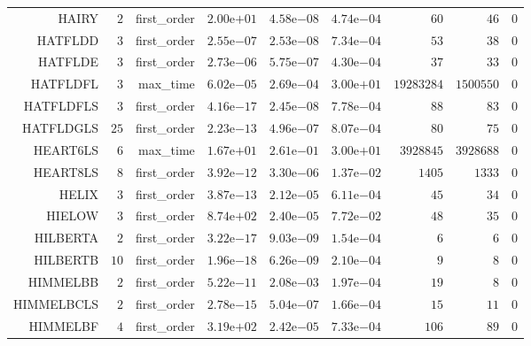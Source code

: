\begin{longtable}{rrrrrrrrr}
HAIRY & \(     2\) & first\_order & \( 2.00\)e\(+01\) & \( 4.58\)e\(-08\) & \( 4.74\)e\(-04\) & \(    60\) & \(    46\) & \(     0\) \\
HATFLDD & \(     3\) & first\_order & \( 2.55\)e\(-07\) & \( 2.53\)e\(-08\) & \( 7.34\)e\(-04\) & \(    53\) & \(    38\) & \(     0\) \\
HATFLDE & \(     3\) & first\_order & \( 2.73\)e\(-06\) & \( 5.75\)e\(-07\) & \( 4.30\)e\(-04\) & \(    37\) & \(    33\) & \(     0\) \\
HATFLDFL & \(     3\) & max\_time & \( 6.02\)e\(-05\) & \( 2.69\)e\(-04\) & \( 3.00\)e\(+01\) & \(19283284\) & \(1500550\) & \(     0\) \\
HATFLDFLS & \(     3\) & first\_order & \( 4.16\)e\(-17\) & \( 2.45\)e\(-08\) & \( 7.78\)e\(-04\) & \(    88\) & \(    83\) & \(     0\) \\
HATFLDGLS & \(    25\) & first\_order & \( 2.23\)e\(-13\) & \( 4.96\)e\(-07\) & \( 8.07\)e\(-04\) & \(    80\) & \(    75\) & \(     0\) \\
HEART6LS & \(     6\) & max\_time & \( 1.67\)e\(+01\) & \( 2.61\)e\(-01\) & \( 3.00\)e\(+01\) & \(3928845\) & \(3928688\) & \(     0\) \\
HEART8LS & \(     8\) & first\_order & \( 3.92\)e\(-12\) & \( 3.30\)e\(-06\) & \( 1.37\)e\(-02\) & \(  1405\) & \(  1333\) & \(     0\) \\
HELIX & \(     3\) & first\_order & \( 3.87\)e\(-13\) & \( 2.12\)e\(-05\) & \( 6.11\)e\(-04\) & \(    45\) & \(    34\) & \(     0\) \\
HIELOW & \(     3\) & first\_order & \( 8.74\)e\(+02\) & \( 2.40\)e\(-05\) & \( 7.72\)e\(-02\) & \(    48\) & \(    35\) & \(     0\) \\
HILBERTA & \(     2\) & first\_order & \( 3.22\)e\(-17\) & \( 9.03\)e\(-09\) & \( 1.54\)e\(-04\) & \(     6\) & \(     6\) & \(     0\) \\
HILBERTB & \(    10\) & first\_order & \( 1.96\)e\(-18\) & \( 6.26\)e\(-09\) & \( 2.10\)e\(-04\) & \(     9\) & \(     8\) & \(     0\) \\
HIMMELBB & \(     2\) & first\_order & \( 5.22\)e\(-11\) & \( 2.08\)e\(-03\) & \( 1.97\)e\(-04\) & \(    19\) & \(     8\) & \(     0\) \\
HIMMELBCLS & \(     2\) & first\_order & \( 2.78\)e\(-15\) & \( 5.04\)e\(-07\) & \( 1.66\)e\(-04\) & \(    15\) & \(    11\) & \(     0\) \\
HIMMELBF & \(     4\) & first\_order & \( 3.19\)e\(+02\) & \( 2.42\)e\(-05\) & \( 7.33\)e\(-04\) & \(   106\) & \(    89\) & \(     0\) \\

\end{longtable}
